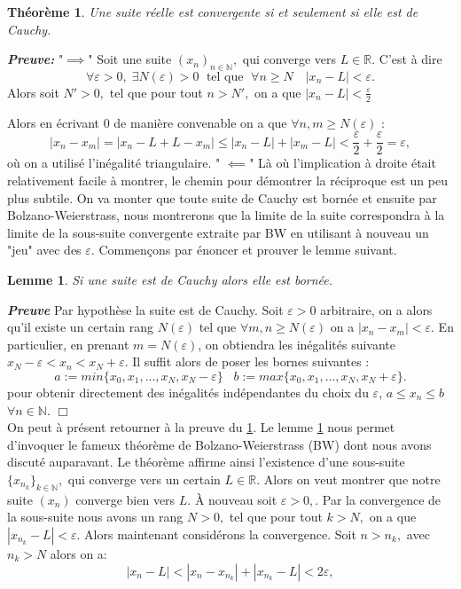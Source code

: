 \documentclass[oneside,12pt,french,table]{book}
\newtheorem{lemma}{Lemme}[chapter]
\theoremstyle{definition}
\theoremstyle{plain}
\newtheorem{theorem}[definition]{Théorème}
\theoremstyle{remark}
\newcommand{\Nn}{{\mathbb{N}}}
\newcommand{\Rr}{{\mathbb{R}}}
\begin{document}
\begin{theorem}\label{thm420}
Une suite réelle est convergente si et seulement si elle est de Cauchy.
\end{theorem}

\textit{\textbf{Preuve:}} \newline 
"$\implies$"
     Soit une suite $(x_n)_{n\in \Nn},$ qui converge vers $L\in \Rr.$ C'est à dire 
    \[
    \forall \varepsilon>0, \; \exists N(\varepsilon) >0 \; \text{ tel que } \; \forall n\geq N \quad |x_n-L|<\varepsilon.
    \]
    Alors soit $N'>0,$ tel que pour tout $n > N',$ on a que   $ |x_n - L| < \frac{\varepsilon}{2}$

    Alors en écrivant 0 de manière convenable on a que $\forall n,m \ge N(\varepsilon)$ :
    $$ |x_n - x_m| = | x_n -L + L -x_m| \le |x_n - L | + | x_m -L | < \frac{\varepsilon}{2} + \frac{\varepsilon}{2} = \varepsilon,$$
    où on a utilisé l'inégalité triangulaire. \newline 
" $\impliedby$" Là où l'implication à droite était relativement facile à montrer, le chemin pour démontrer la réciproque est un peu plus subtile. On va monter que toute suite de Cauchy est bornée et ensuite par Bolzano-Weierstrass, nous montrerons que la limite de la suite correspondra à la limite de la sous-suite convergente extraite par BW en utilisant à nouveau un "jeu" avec des $\varepsilon$. Commençons par énoncer et prouver le lemme suivant. 

\begin{lemma}\label{lem46}
    Si une suite est de Cauchy alors elle est bornée. 
\end{lemma}  

\textit{\textbf{Preuve}} Par hypothèse la suite est de Cauchy. Soit $\varepsilon >0 $ arbitraire, on a alors qu'il existe un certain rang $N(\varepsilon)$ tel que $\forall m,n \ge N(\varepsilon)$ on a $|x_n-x_m| < \varepsilon$. En particulier, en prenant $m = N(\varepsilon)$, on obtiendra les inégalités suivante $x_N - \varepsilon < x_n < x_N + \varepsilon$. Il suffit alors de poser les bornes suivantes : 
$$ a := min \{x_0, x_1, ..., x_N, x_N - \varepsilon \} \;\;\; b := max \{x_0, x_1, ..., x_N, x_N + \varepsilon \}. $$
pour obtenir directement des inégalités indépendantes du choix du $\varepsilon$, $a \le x_n \le b $ $ \forall n \in \Nn$. $\Box$ \\ \newline
On peut à présent retourner à la preuve du \ref{thm420}. Le lemme \ref{lem46} nous permet d'invoquer le fameux théorème de Bolzano-Weierstrass (BW) dont nous avons discuté auparavant. 
Le théorème affirme ainsi l'existence d'une sous-suite $\{x_{n_k}\}_{k\in\Nn},$ qui converge vers un certain $L\in \Rr.$ Alors on veut montrer que notre suite $(x_n)$ converge bien vers $L.$
À nouveau soit $\varepsilon > 0,$. Par la convergence de la sous-suite nous avons un rang $N > 0,$ tel que pour tout $k > N,$ on a que $|x_{n_k} - L| < \varepsilon.$ Alors maintenant considérons la convergence. Soit $n > n_k,$ avec $n_k > N$ alors on a:
\[
|x_n - L| < |x_n - x_{n_k}| + |x_{n_k} - L| < 2\varepsilon,
\]
\end{document}
